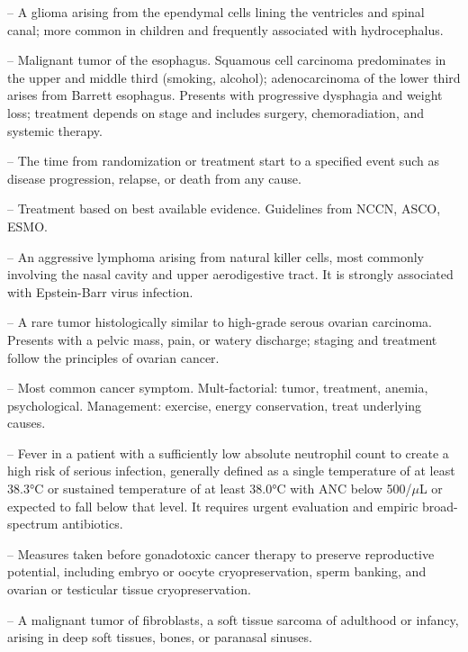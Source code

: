 -- A glioma arising from the ependymal cells lining the ventricles and spinal canal; more common in children and frequently associated with hydrocephalus.

-- Malignant tumor of the esophagus. Squamous cell carcinoma predominates in the upper and middle third (smoking, alcohol); adenocarcinoma of the lower third arises from Barrett esophagus. Presents with progressive dysphagia and weight loss; treatment depends on stage and includes surgery, chemoradiation, and systemic therapy.

-- The time from randomization or treatment start to a specified event such as disease progression, relapse, or death from any cause.

-- Treatment based on best available evidence. Guidelines from NCCN, ASCO, ESMO.

-- An aggressive lymphoma arising from natural killer cells, most commonly involving the nasal cavity and upper aerodigestive tract. It is strongly associated with Epstein-Barr virus infection.

-- A rare tumor histologically similar to high-grade serous ovarian carcinoma. Presents with a pelvic mass, pain, or watery discharge; staging and treatment follow the principles of ovarian cancer.

-- Most common cancer symptom. Mult-factorial: tumor, treatment, anemia, psychological. Management: exercise, energy conservation, treat underlying causes.

-- Fever in a patient with a sufficiently low absolute neutrophil count to create a high risk of serious infection, generally defined as a single temperature of at least 38.3°C or sustained temperature of at least 38.0°C with ANC below 500/\(\mu\)L or expected to fall below that level. It requires urgent evaluation and empiric broad-spectrum antibiotics.

-- Measures taken before gonadotoxic cancer therapy to preserve reproductive potential, including embryo or oocyte cryopreservation, sperm banking, and ovarian or testicular tissue cryopreservation.

-- A malignant tumor of fibroblasts, a soft tissue sarcoma of adulthood or infancy, arising in deep soft tissues, bones, or paranasal sinuses.

